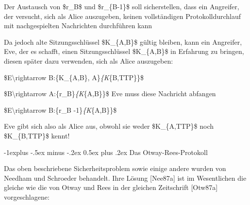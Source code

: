 \documentclass[a4paper]{article}
\makeatletter
\renewcommand{\subsection}{\@startsection{subsection}{2}{0mm}%
 {-1explus -.5ex minus -.2ex}%
 {0.5ex plus .2ex}%
 {\normalfont\normalsize\bfseries}}
\makeatother
\begin{document}
\begin{multicols}{3}
\begin{itemize*}
            \begin{itemize*}
                  \item Der Austausch von \$r\_B\$ und \$r\_\{B-1\}\$ soll sicherstellen, dass ein Angreifer, der versucht, sich als Alice auszugeben, keinen vollständigen Protokolldurchlauf mit nachgespielten Nachrichten durchführen kann
                  \item Da jedoch alte Sitzungsschlüssel \$K\_\{A,B\}\$ gültig bleiben, kann ein Angreifer, Eve, der es schafft, einen Sitzungsschlüssel \$K\_\{A,B\}\$ in Erfahrung zu bringen, diesen später dazu verwenden, sich als Alice auszugeben:
                  \begin{enumerate*} \def\labelenumi{\arabic{enumi}.} \item \$E\textbackslash rightarrow B:\{K\_\{A,B\}, A\}\emph{\{K}\{B,TTP\}\}\$ \item \$B\textbackslash rightarrow A:\{r\_B\}\emph{\{K}\{A,B\}\}\$ Eve muss diese Nachricht abfangen \item \$E\textbackslash rightarrow B:\{r\_B -1\}\emph{\{K}\{A,B\}\}\$ \end{enumerate*}
                  \begin{itemize*} \item Eve gibt sich also als Alice aus, obwohl sie weder \$K\_\{A,TTP\}\$ noch \$K\_\{B,TTP\}\$ kennt! \end{itemize*}
            \end{itemize*}
      \end{itemize*}


      \subsection{Das Otway-Rees-Protokoll}

      \begin{itemize*}
            \item
            Das oben beschriebene Sicherheitsproblem sowie einige andere wurden
            von Needham und Schroeder behandelt. Ihre Lösung {[}Nee87a{]} ist im
            Wesentlichen die gleiche wie die von Otway und Rees in der gleichen
            Zeitschrift {[}Otw87a{]} vorgeschlagene:


\end{itemize*}
\end{multicols}
\end{document}
